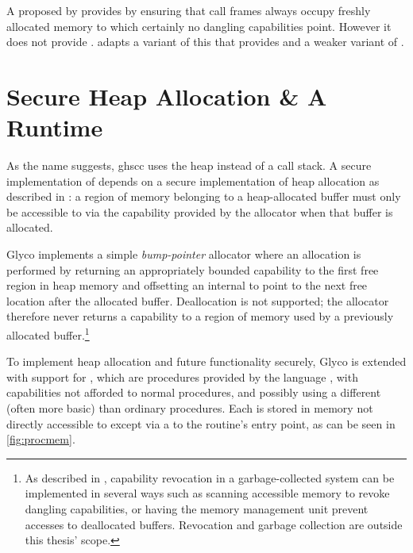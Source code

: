\documentclass[main.tex]{subfiles}
\begin{document}
A  proposed by \cite[section~7.3]{cerise} provides  by ensuring that call frames always occupy freshly allocated memory to which certainly no dangling capabilities point. However it does not provide .  adapts a variant of this  that provides  and a weaker variant of .

\section{Secure Heap Allocation \& A Runtime} \label{sct:ghscc-rt}
As the name suggests, \acrlong{ghscc} uses the heap instead of a call stack. A secure implementation of  depends on a secure implementation of heap allocation as described in \cite[section~7.1]{cerise}: a region of memory belonging to a heap-allocated buffer must only be accessible to  via the capability provided by the allocator when that buffer is allocated.

Glyco implements a simple \emph{bump-pointer} allocator where an allocation is performed by returning an appropriately bounded capability to the first free region in heap memory and offsetting an internal \textbf{} to point to the next free location after the allocated buffer. Deallocation is not supported; the allocator therefore never returns a capability to a region of memory used by a previously allocated buffer.\footnote{As described in \cite[section~2.3.16]{cheri}, capability revocation in a garbage-collected system can be implemented in several ways such as scanning accessible memory to revoke dangling capabilities, or having the memory management unit prevent accesses to deallocated buffers. Revocation and garbage collection are outside this thesis' scope.}

To implement heap allocation and future functionality securely, Glyco is extended with support for , which are procedures provided by the language , with capabilities not afforded to normal procedures, and possibly using a different (often more basic)  than ordinary procedures. Each  is stored in memory not directly accessible to  except via a  to the routine's entry point, as can be seen in \cref{fig:procmem}.
\end{document}

